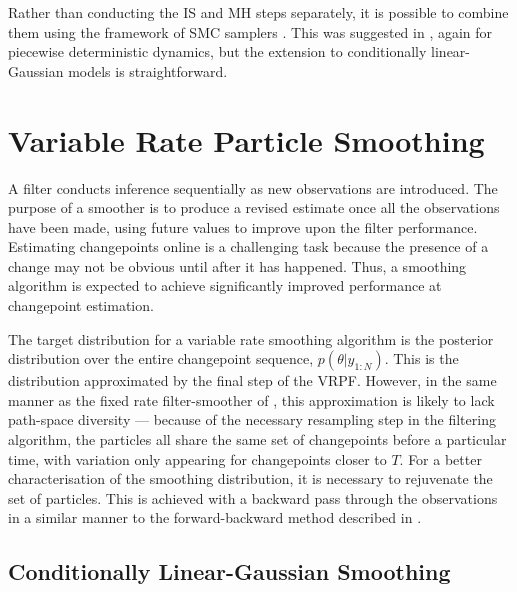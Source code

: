 \documentclass[journal]{IEEEtran}
\begin{document}
Rather than conducting the IS and MH steps separately, it is possible to combine them using the framework of SMC samplers \cite{DelMoral2006}. This was suggested in \cite{Whiteley2011}, again for piecewise deterministic dynamics, but the extension to conditionally linear-Gaussian models is straightforward.




\section{Variable Rate Particle Smoothing} \label{sec:vrps}

A filter conducts inference sequentially as new observations are introduced. The purpose of a smoother is to produce a revised estimate once all the observations have been made, using future values to improve upon the filter performance. Estimating changepoints online is a challenging task because the presence of a change may not be obvious until after it has happened. Thus, a smoothing algorithm is expected to achieve significantly improved performance at changepoint estimation.

The target distribution for a variable rate smoothing algorithm is the posterior distribution over the entire changepoint sequence, $p(\theta|y_{1:N})$. This is the distribution approximated by the final step of the VRPF. However, in the same manner as the fixed rate filter-smoother of \cite{Kitagawa1996}, this approximation is likely to lack path-space diversity --- because of the necessary resampling step in the filtering algorithm, the particles all share the same set of changepoints before a particular time, with variation only appearing for changepoints closer to $T$. For a better characterisation of the smoothing distribution, it is necessary to rejuvenate the set of particles. This is achieved with a backward pass through the observations in a similar manner to the forward-backward method described in \cite{Godsill2004}.



\subsection{Conditionally Linear-Gaussian Smoothing} \label{sec:rb-vrps}
\end{document}
